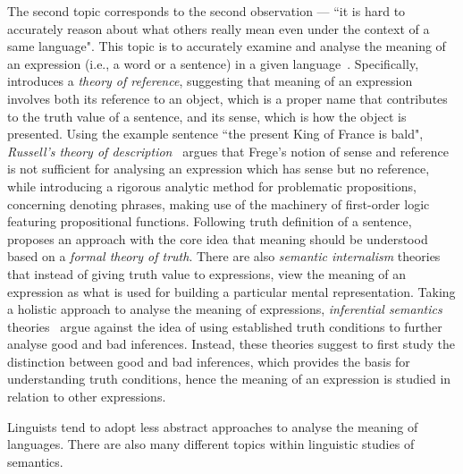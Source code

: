 The second topic corresponds to the second observation --- ``it is hard to accurately reason about what others really mean even under the context of a same language". This topic is to accurately examine and analyse the meaning of an expression (i.e., a word or a sentence) in a given language~\citep{lewis1970}. Specifically, \citet{frege1892} introduces a \emph{theory of reference}, suggesting that meaning of an expression involves both its reference to an object, which is a proper name that contributes to the truth value of a sentence, and its sense, which is how the object is presented. Using the example sentence ``the present King of France is bald", \emph{Russell's theory of description}~\citep{russell1904} argues that Frege's notion of sense and reference is not sufficient for analysing an expression which has sense but no reference, while introducing a rigorous analytic method for problematic propositions, concerning denoting phrases, making use of the machinery of first-order logic featuring propositional functions. Following  truth definition of a sentence, \citet{davidson1967} proposes an approach with the core idea that meaning should be understood based on a \emph{formal theory of truth}. There are also \emph{semantic internalism} theories~\citep{Mcgilvray1998, Chomsky2000, pietroski2017semantic} that instead of giving truth value to expressions, view the meaning of an expression as what is used for building a particular mental representation. Taking a holistic approach to analyse the meaning of expressions, \emph{inferential semantics} theories~\citep{Brandom2000} argue against the idea of using established truth conditions to further analyse good and bad inferences. Instead, these theories suggest to first study the distinction between good and bad inferences, which provides the basis for understanding truth conditions, hence the meaning of an expression is studied in relation to other expressions. 
\begin{center}
\vspace{-0.7em}
\vspace{-0.3em}
\end{center}

Linguists tend to adopt less abstract approaches to analyse the meaning of languages. There are also many different topics within linguistic studies of semantics.

